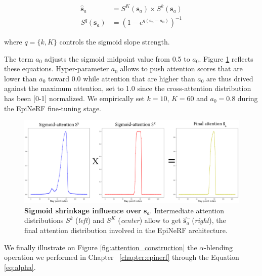 \begin{equation}
\begin{split}
\hat{\textbf{s}}_{a} &= S^{K}(\textbf{s}_{a})\times S^{k}(\textbf{s}_{a}) \\
S^{q}(\mathbf{s}_{a}) &= \left(1- e^{q(\mathbf{s}_{a}-a_{0})}\right)^{-1}
\end{split}
\end{equation}

where $q=\{k,K\}$ controls the sigmoid slope strength. \newline

The term $a_{0}$ adjusts the sigmoid midpoint value from 0.5 to $a_{0}$. Figure \ref{fig:attention_sigmoid} reflects these equations. Hyper-parameter $a_{0}$ allows to push attention scores that are lower than  $a_{0}$ toward 0.0 while attention that are higher than $a_{0}$ are thus drived against the maximum attention, set to 1.0 since the cross-attention distribution has been [0-1] normalized. We empirically set $k=10$, $K=60$ and $a_{0}=0.8$ during the EpiNeRF fine-tuning stage.\newline

\begin{figure}[h!]
    \begin{center}
  \includegraphics[width=\linewidth]{images/epinerf/SUPP_ATT_OVERLEAF.png}
  \caption{\textbf{Sigmoid shrinkage influence over} $\textbf{s}_{a}$. Intermediate attention distributions $S^{k}$ (\textit{left}) and $S^{K}$ (\textit{center}) allow to get $\hat{\mathbf{s}_{a}}$ (\textit{right}), the final attention distribution involved in the EpiNeRF architecture.}
  \label{fig:attention_sigmoid}
  \end{center}
\end{figure}

We finally illustrate on Figure \ref{fig:attention_construction} the $\alpha$-blending operation we performed in Chapter ~\ref{chapter:epinerf} through the Equation \ref{eq:alpha}. 

